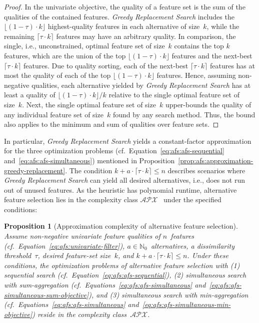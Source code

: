 \documentclass{article}
\newtheorem{proposition}{Proposition}
\theoremstyle{definition}
\begin{document}
%
\begin{proof}
	In the univariate objective, the quality of a feature set is the sum of the qualities of the contained features.
	\emph{Greedy Replacement Search} includes the $\lfloor (1 - \tau) \cdot k \rfloor$ highest-quality features in each alternative of size~$k$, while the remaining $\lceil \tau \cdot k \rceil$ features may have an arbitrary quality.
	In comparison, the single, i.e., unconstrained, optimal feature set of size~$k$ contains the top $k$ features, which are the union of the top $\lfloor (1 - \tau) \cdot k \rfloor$ features and the next-best $\lceil \tau \cdot k \rceil$ features.
	Due to quality sorting, each of the next-best $\lceil \tau \cdot k \rceil$ features has at most the quality of each of the top $\lfloor (1 - \tau) \cdot k \rfloor$ features.
	Hence, assuming non-negative qualities, each alternative yielded by \emph{Greedy Replacement Search} has at least a quality of $\lfloor (1 - \tau) \cdot k \rfloor / k$ relative to the single optimal feature set of size~$k$.
	Next, the single optimal feature set of size~$k$ upper-bounds the quality of any individual feature set of size~$k$ found by any search method.
	Thus, the bound also applies to the minimum and sum of qualities over feature sets.
\end{proof}
%
In particular, \emph{Greedy Replacement Search} yields a constant-factor approximation for the three optimization problems (cf.~Equation~\ref{eq:afs:afs-sequential} and~\ref{eq:afs:afs-simultaneous}) mentioned in Proposition~\ref{prop:afs:approximation-greedy-replacement}.
The condition $k + a \cdot \lceil \tau \cdot k \rceil \leq n$ describes scenarios where \emph{Greedy Replacement Search} can yield all desired alternatives, i.e., does not run out of unused features.
As the heuristic has polynomial runtime, alternative feature selection lies in the complexity class $\mathcal{APX}$~\cite{khanna1998syntactic} under the specified conditions:
%
\begin{proposition}[Approximation complexity of alternative feature selection]
	Assume non-negative univariate feature qualities of $n$~features (cf.~Equation~\ref{eq:afs:univariate-filter}), $a \in \mathbb{N}_0$~alternatives, a dissimilarity threshold~$\tau$, desired feature-set size~$k$, and $k + a \cdot \lceil \tau \cdot k \rceil \leq n$.
	Under these conditions, the optimization problems of alternative feature selection with (1) sequential search (cf.~Equation~\ref{eq:afs:afs-sequential}), (2) simultaneous search with sum-aggregation (cf.~Equations~\ref{eq:afs:afs-simultaneous} and~\ref{eq:afs:afs-simultaneous-sum-objective}), and (3) simultaneous search with min-aggregation (cf.~Equations~\ref{eq:afs:afs-simultaneous} and~\ref{eq:afs:afs-simultaneous-min-objective}) reside in the complexity class~$\mathcal{APX}$.
	\label{prop:afs:approximation-apx}
\end{proposition}
\end{document}
